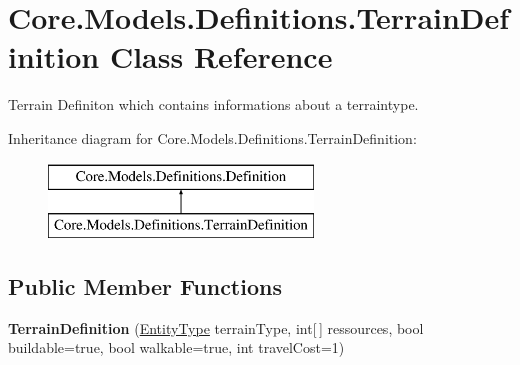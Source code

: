 \hypertarget{classCore_1_1Models_1_1Definitions_1_1TerrainDefinition}{\section{Core.\-Models.\-Definitions.\-Terrain\-Definition Class Reference}
\label{classCore_1_1Models_1_1Definitions_1_1TerrainDefinition}
}


Terrain Definiton which contains informations about a terraintype.  


Inheritance diagram for Core.\-Models.\-Definitions.\-Terrain\-Definition\-:\begin{figure}[H]
\begin{center}
\leavevmode
\includegraphics[height=2.000000cm]{classCore_1_1Models_1_1Definitions_1_1TerrainDefinition}
\end{center}
\end{figure}
\subsection*{Public Member Functions}
\begin{DoxyCompactItemize}
\item 
\hypertarget{classCore_1_1Models_1_1Definitions_1_1TerrainDefinition_a39711d31c329fe859102166584b11ec0}{{\bfseries Terrain\-Definition} (\hyperlink{namespaceCore_1_1Models_1_1Definitions_a609ed13db028308ebc6c5fbd98615fdc}{Entity\-Type} terrain\-Type, int\mbox{[}$\,$\mbox{]} ressources, bool buildable=true, bool walkable=true, int travel\-Cost=1)}\label{classCore_1_1Models_1_1Definitions_1_1TerrainDefinition_a39711d31c329fe859102166584b11ec0}

\end{DoxyCompactItemize}
